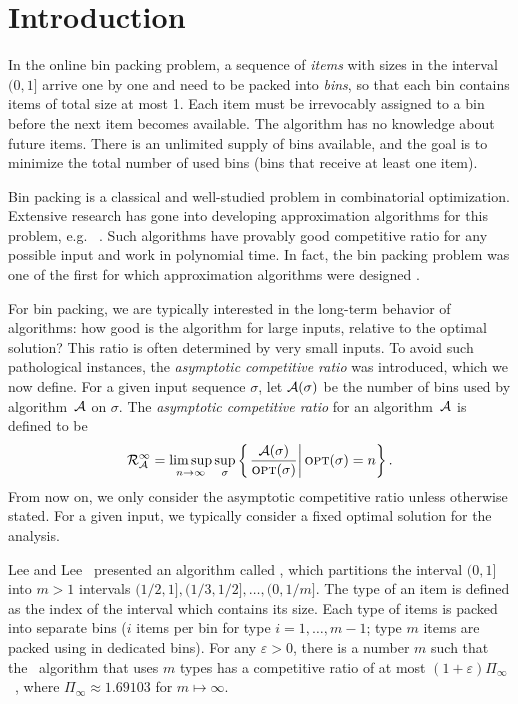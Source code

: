 \section{Introduction}
In the online bin packing problem, a sequence of \emph{items} with sizes in the
interval $(0,1]$ arrive one by one and need to be packed into \emph{bins}, so that
each bin contains items of total size at most 1. Each item must be irrevocably
assigned to a bin before
the next item becomes available. The algorithm has no knowledge about future items.
There is an unlimited supply of bins available, and the goal is to minimize the 
total number of used bins (bins that receive at least one item).

Bin packing is a classical and well-studied problem in combinatorial optimization. 
Extensive research has gone into developing approximation
algorithms for this problem, e.g. ~\cite{CoGaJo97,GaGrUl72,FerLue81,KarKar82,Rothvoss13,GoeRot14}. Such algorithms have provably good competitive ratio for any possible
input and work in polynomial time. In fact, the bin packing problem was one 
of the first for which approximation algorithms were designed \cite{Johnso73}. 

For bin packing, we are typically interested in the long-term behavior of
algorithms: how good is the algorithm for large inputs, relative to the optimal solution? 
This ratio is often determined by very small inputs. 
To avoid such pathological
instances, the {\em asymptotic competitive ratio} was introduced,
which we now define. For a given input sequence $\sigma$,
let $\mathcal{A}(\sigma)$ be the number of bins used by algorithm~$\mathcal{A}$ on $\sigma$.
The {\em asymptotic competitive ratio} for an algorithm~$\mathcal{A}$ is defined to be
\begin{equation}
\label{eq:apr}
\mathcal{R}^{\infty}_{\mathcal{A}} = \limsup_{n\to\infty}\sup_\sigma\left\{\left. \frac{{\mathcal{A}} (\sigma)}
{ \mbox{\textsc{opt}}(\sigma)} \right| \mbox{\textsc{opt}}(\sigma) = n\right\}.
\end{equation}
From now on, we only consider the asymptotic competitive ratio unless otherwise stated. 
For a given input, we typically consider a fixed optimal solution for the analysis.

Lee and Lee~\cite{LeeLee85} presented an algorithm called \harm, 
which partitions the interval
$(0,1]$ into $m>1$ intervals $(1/2,1], (1/3,1/2],\dots,(0,1/m]$.
The type of an item is defined as the index of the interval which contains its size.
Each type of items is packed into separate bins ($i$ items per bin for type $i=1,\dots,m-1$; type $m$ items are packed
using {\nf} in dedicated bins).
For any $\varepsilon>0$, there is a number $m$ such that the \harm\ algorithm
that uses $m$ types has a competitive ratio of at most
$(1+\varepsilon)\Pi_{\infty}$~\cite{LeeLee85}, where $\Pi_{\infty} \approx 1.69103$ for $m \mapsto \infty$.

